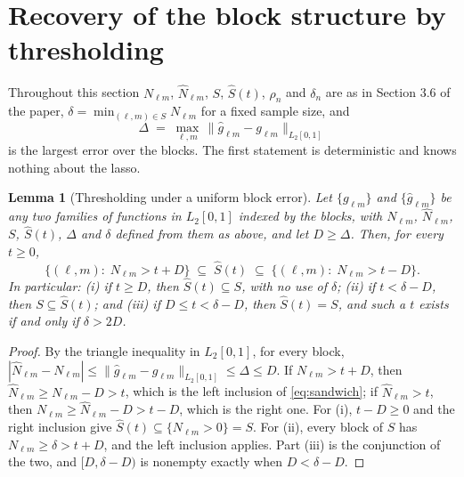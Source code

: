 \documentclass[10pt]{book}
\newtheorem{lemma}{Lemma}[section]
\theoremstyle{definition}
\newcommand{\cv}{\ell}
\newcommand{\md}{m}
\newcommand{\gcomp}[2]{g_{#1#2}}
\begin{document}
{\color{colR1}
\section{Recovery of the block structure by thresholding}
\setcounter{equation}{0}

Throughout this section $N_{\cv\md}$, $\widehat{N}_{\cv\md}$, $S$,
$\widehat{S}(t)$, $\rho_n$ and $\delta_n$ are as in Section 3.6 of the paper,
$\delta = \min_{(\cv,\md)\in S}N_{\cv\md}$ for a fixed sample size, and
\[
  \Delta \;=\; \max_{\cv,\md}\,
  \bigl\lVert \widehat{g}_{\cv\md} - \gcomp{\cv}{\md} \bigr\rVert_{L_2[0,1]}
\]
is the largest error over the blocks. The first statement is deterministic
and knows nothing about the lasso.

\begin{lemma}[Thresholding under a uniform block error]
\label{lem:sandwich}
Let $\{\gcomp{\cv}{\md}\}$ and $\{\widehat{g}_{\cv\md}\}$ be any two families
of functions in $L_2[0,1]$ indexed by the blocks, with $N_{\cv\md}$,
$\widehat{N}_{\cv\md}$, $S$, $\widehat{S}(t)$, $\Delta$ and $\delta$ defined
from them as above, and let $D \ge \Delta$. Then, for every $t \ge 0$,
\begin{equation}
  \label{eq:sandwich}
  \bigl\{(\cv,\md) :\; N_{\cv\md} > t + D\bigr\}
  \;\subseteq\; \widehat{S}(t) \;\subseteq\;
  \bigl\{(\cv,\md) :\; N_{\cv\md} > t - D\bigr\} .
\end{equation}
In particular: (i) if $t \ge D$, then $\widehat{S}(t) \subseteq S$, with no
use of $\delta$; (ii) if $t < \delta - D$, then $S \subseteq \widehat{S}(t)$;
and (iii) if $D \le t < \delta - D$, then $\widehat{S}(t) = S$, and such a $t$
exists if and only if $\delta > 2D$.
\end{lemma}

\begin{proof}
By the triangle inequality in $L_2[0,1]$, for every block,
$|\widehat{N}_{\cv\md} - N_{\cv\md}| \le
\lVert\widehat{g}_{\cv\md} - \gcomp{\cv}{\md}\rVert_{L_2[0,1]} \le \Delta \le D$.
If $N_{\cv\md} > t + D$, then
$\widehat{N}_{\cv\md} \ge N_{\cv\md} - D > t$, which is the left inclusion of
\eqref{eq:sandwich}; if $\widehat{N}_{\cv\md} > t$, then
$N_{\cv\md} \ge \widehat{N}_{\cv\md} - D > t - D$, which is the right one. For
(i), $t - D \ge 0$ and the right inclusion give $\widehat{S}(t) \subseteq
\{N_{\cv\md} > 0\} = S$. For (ii), every block of $S$ has
$N_{\cv\md} \ge \delta > t + D$, and the left inclusion applies. Part (iii) is
the conjunction of the two, and $[D, \delta - D)$ is nonempty exactly when
$D < \delta - D$.
\end{proof}

}
\end{document}
